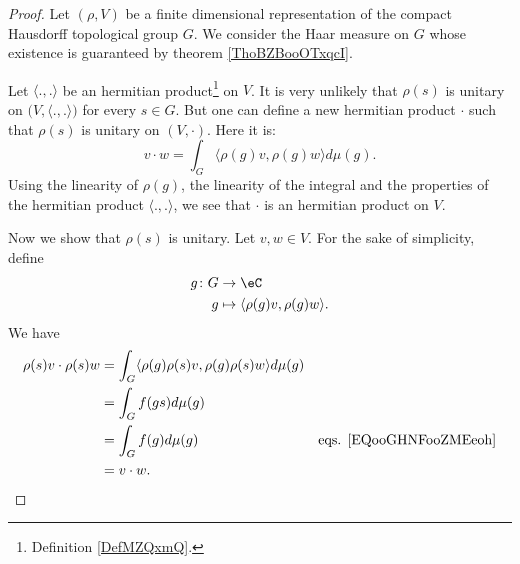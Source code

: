 \begin{proof}
	Let \( (\rho,V)\) be a finite dimensional representation of the compact Hausdorff topological group \( G\). We consider the Haar measure on \( G\) whose existence is guaranteed by theorem \ref{ThoBZBooOTxqcI}.

	Let \( \langle ., .\rangle \) be an hermitian product\footnote{Definition \ref{DefMZQxmQ}.} on \( V\). It is very unlikely that \( \rho(s)\) is unitary on \( \big( V,\langle ., .\rangle  \big)\) for every \( s\in G\). But one can define a new hermitian product \( \cdot\) such that \( \rho(s)\) is unitary on \( (V,\cdot)\). Here it is:
	\begin{equation}
		v\cdot w=\int_G\langle \rho(g)v, \rho(g)w\rangle d\mu(g).
	\end{equation}
	Using the linearity of \( \rho(g)\), the linearity of the integral and the properties of the hermitian product \( \langle ., .\rangle \), we see that \( \cdot \) is an hermitian product on \( V\).

	Now we show that \( \rho(s)\) is unitary. Let \( v,w\in V\). For the sake of simplicity, define
	\begin{equation}
		\begin{aligned}
			g\colon G & \to \eC                                      \\
			g         & \mapsto \langle \rho(g)v, \rho(g)w\rangle  .
		\end{aligned}
	\end{equation}
	We have
	\begin{subequations}
		\begin{align}
			\rho(s)v\cdot\rho(s)w & =\int_G\langle \rho(g)\rho(s)v, \rho(g)\rho(s)w\rangle d\mu(g)                                        \\
			                      & =\int_Gf(gs)d\mu(g)                                                                                   \\
			                      & =\int_Gf(g)d\mu(g)                                             & \text{eqs. \eqref{EQooGHNFooZMEeoh}} \\
			                      & =v\cdot w.
		\end{align}
	\end{subequations}
\end{proof}
